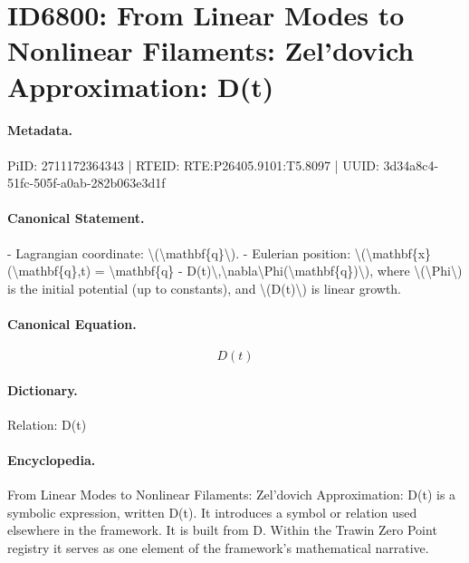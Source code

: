 \section*{ID6800: From Linear Modes to Nonlinear Filaments: Zel’dovich Approximation: D(t)}
\paragraph{Metadata.}
PiID: 2711172364343 | RTEID: RTE:P26405.9101:T5.8097 | UUID: 3d34a8c4-51fc-505f-a0ab-282b063e3d1f

\paragraph{Canonical Statement.}
- Lagrangian coordinate: \textbackslash{}(\textbackslash{}mathbf\{q\}\textbackslash{}). - Eulerian position: \textbackslash{}(\textbackslash{}mathbf\{x\}(\textbackslash{}mathbf\{q\},t) = \textbackslash{}mathbf\{q\} - D(t)\textbackslash{},\textbackslash{}nabla\textbackslash{}Phi(\textbackslash{}mathbf\{q\})\textbackslash{}), where \textbackslash{}(\textbackslash{}Phi\textbackslash{}) is the initial potential (up to constants), and \textbackslash{}(D(t)\textbackslash{}) is linear growth.

\paragraph{Canonical Equation.}
\[
D(t)
\]

\paragraph{Dictionary.}
Relation: D(t)

\paragraph{Encyclopedia.}
From Linear Modes to Nonlinear Filaments: Zel’dovich Approximation: D(t) is a symbolic expression, written D(t). It introduces a symbol or relation used elsewhere in the framework. It is built from D. Within the Trawin Zero Point registry it serves as one element of the framework's mathematical narrative.
